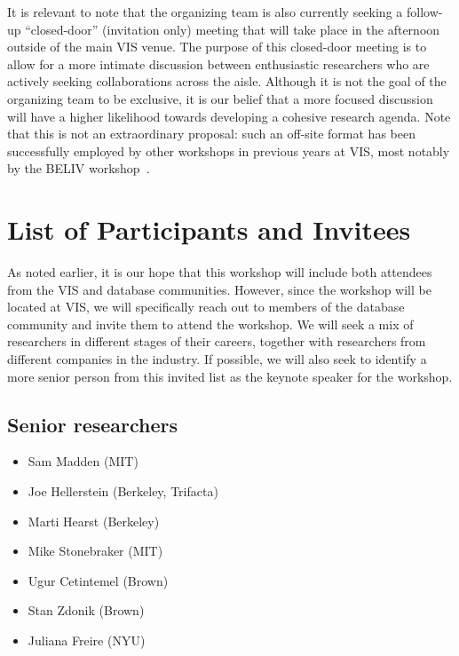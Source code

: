 \documentclass[journal]{vgtc}                %
\begin{document}
It is relevant to note that the organizing team is also currently seeking a follow-up ``closed-door'' (invitation only) meeting that will take place in the afternoon outside of the main VIS venue. 
The purpose of this closed-door meeting is to allow for a more intimate discussion between enthusiastic researchers who are actively seeking collaborations across the aisle. 
Although it is not the goal of the organizing team to be exclusive, it is our belief that a more focused
discussion will have a higher likelihood towards developing a cohesive research agenda. 
Note that this is not an extraordinary proposal: such an off-site format has been successfully employed by other workshops in previous years at VIS, most notably by the BELIV workshop~.

\section{List of Participants and Invitees}
\label{sec:invitees}

As noted earlier, it is our hope that this workshop will include both attendees from the VIS and database communities. 
However, since the workshop will be located at VIS, we will specifically reach out to members of the database community and invite them to attend the workshop. 
We will seek a mix of researchers in different stages of their careers, together with researchers from different companies in the industry. 
If possible, we will also seek to identify a more senior person from this invited list as the keynote speaker for the workshop.

\subsection*{Senior researchers}
\begin{itemize}[topsep=0pt, partopsep=0pt, itemsep=-3pt]
\item Sam Madden (MIT)
\item Joe Hellerstein (Berkeley, Trifacta)
\item Marti Hearst (Berkeley)
\item Mike Stonebraker (MIT)
\item Ugur Cetintemel (Brown)
\item Stan Zdonik (Brown)
\item Juliana Freire (NYU)
\end{itemize}
\end{document}
